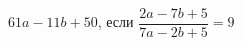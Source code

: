 \begin{ex}[type=calculate_expression]
	\begin{condition}
		\( 61a-11b+50 \), если \( \dfrac{2a-7b+5}{7a-2b+5}=9 \)
	\end{condition}
\end{ex}